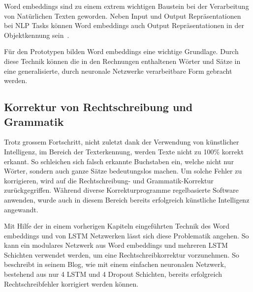 Word embeddings sind zu einem extrem wichtigen Baustein bei der Verarbeitung von Natürlichen Texten geworden. Neben Input und Output Repräsentationen bei NLP Tasks können Word embeddings auch Output Repräsentationen in der Objektkennung sein~\autocite{Olah2014b}. 

Für den Prototypen bilden Word embeddings eine wichtige Grundlage. Durch diese Technik können die in den Rechnungen enthaltenen Wörter und Sätze in eine generalisierte, durch neuronale Netzwerke verarbeitbare Form gebracht werden.

\subsection{Korrektur von Rechtschreibung und Grammatik}
\label{chap:grammar-correction}

Trotz grossem Fortschritt, nicht zuletzt dank der Verwendung von künstlicher Intelligenz, im Bereich der Texterkennung, werden Texte nicht zu 100\% korrekt erkannt. So schleichen sich falsch erkannte Buchstaben ein, welche nicht nur Wörter, sondern auch ganze Sätze bedeutungslos machen. Um solche Fehler zu korrigieren, wird auf die Rechtschreibung- und Grammatik-Korrektur zurückgegriffen. Während diverse Korrekturprogramme regelbasierte Software anwenden, wurde auch in diesem Bereich bereits erfolgreich künstliche Intelligenz angewandt.

Mit Hilfe der in einem vorherigen Kapiteln eingeführten Technik des Word embeddings und von LSTM Netzwerken lässt sich diese Problematik angehen. So kann ein modulares Netzwerk aus Word embeddings und mehreren LSTM Schichten verwendet werden, um eine Rechtschreibkorrektur vorzunehmen. So beschreibt \textcite{Weiss2016} in seinem Blog, wie mit einem einfachen neuronalen Netzwerk, bestehend aus nur 4 LSTM und 4 Dropout Schichten, bereits erfolgreich Rechtschreibfehler korrigiert werden können. 

